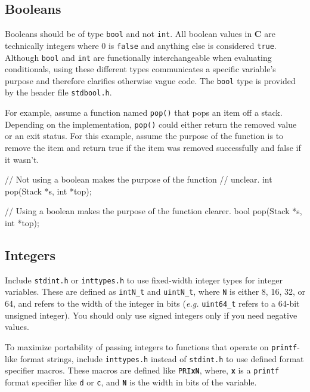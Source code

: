 \documentclass[11pt]{article}
\begin{document}
\subsection{Booleans}

\noindent Booleans should be of type \texttt{bool} and not \texttt{int}.  All
boolean values in \textbf{C} are technically integers where $0$ is
\texttt{false} and anything else is considered \texttt{true}. Although
\texttt{bool} and \texttt{int} are functionally interchangeable when evaluating
conditionals, using these different types communicates a specific variable's
purpose and therefore clarifies otherwise vague code. The \texttt{bool} type is
provided by the header file \texttt{stdbool.h}.

For example, assume a function named \texttt{pop()} that pops an item off a
stack. Depending on the implementation, \texttt{pop()} could either return the
removed value or an exit status. For this example, assume the purpose of the
function is to remove the item and return true if the item was removed
successfully and false if it wasn't.

\begin{clisting}{}
// Not using a boolean makes the purpose of the function
// unclear.
int pop(Stack *s, int *top);

// Using a boolean makes the purpose of the function clearer.
bool pop(Stack *s, int *top);
\end{clisting}


\subsection{Integers}

\noindent Include \texttt{stdint.h} or \texttt{inttypes.h} to use
fixed-width integer types for integer variables. These are defined as
\texttt{intN\_t} and \texttt{uintN\_t}, where \texttt{N} is either 8,
16, 32, or 64, and refers to the width of the integer in bits
(\emph{e.g.} \texttt{uint64\_t} refers to a 64-bit unsigned integer).
You should only use signed integers only if you need negative values.

To maximize portability of passing integers to functions that operate on
\texttt{printf}-like format strings, include \texttt{inttypes.h} instead
of \texttt{stdint.h} to use defined format specifier macros. These
macros are defined like \texttt{PRI\textbf{xN}}, where,
\texttt{\textbf{x}} is a \texttt{printf} format specifier like
\texttt{d} or \texttt{c}, and \texttt{\textbf{N}} is the width in bits
of the variable.
\end{document}
